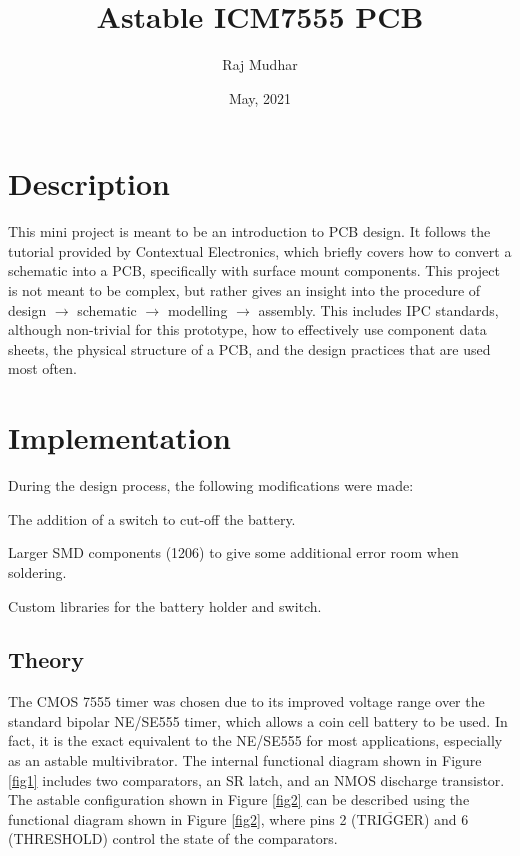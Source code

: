 \documentclass[10pt,twocolumn]{article}
\begin{document}
\title{\huge{\textbf{Astable ICM7555 PCB}}}
\author{Raj Mudhar}
\date{May, 2021}
\maketitle

\section{Description}

This mini project is meant to be an introduction to PCB design. It follows the tutorial provided by Contextual Electronics, which briefly covers how to convert a schematic into a PCB, specifically with surface mount components. This project is not meant to be complex, but rather gives an insight into the procedure of design $\rightarrow$ schematic $\rightarrow$ modelling $\rightarrow$ assembly. This includes IPC standards, although non-trivial for this prototype, how to effectively use component data sheets, the physical structure of a PCB, and the design practices that are used most often.

\section{Implementation}

During the design process, the following modifications were made:
\begin{compactitem}
  \item The addition of a switch  to cut-off the battery.
  \item Larger SMD components (1206) to give some additional error room when soldering.
  \item Custom libraries for the battery holder and switch.
\end{compactitem}

\subsection{Theory}

The CMOS 7555 timer was chosen due to its improved voltage range over the standard bipolar NE/SE555 timer, which allows a coin cell battery to be used. In fact, it is the exact equivalent to the NE/SE555  for most applications, especially as an astable multivibrator. The internal functional diagram shown in Figure \ref{fig1} includes two comparators, an SR latch, and an NMOS discharge transistor. The astable configuration shown in Figure \ref{fig2} can be described using the functional diagram shown in Figure \ref{fig2}, where pins 2 ($ \overline{\mbox{TRIGGER}}$) and 6 (THRESHOLD) control the state of the comparators.
\end{document}
